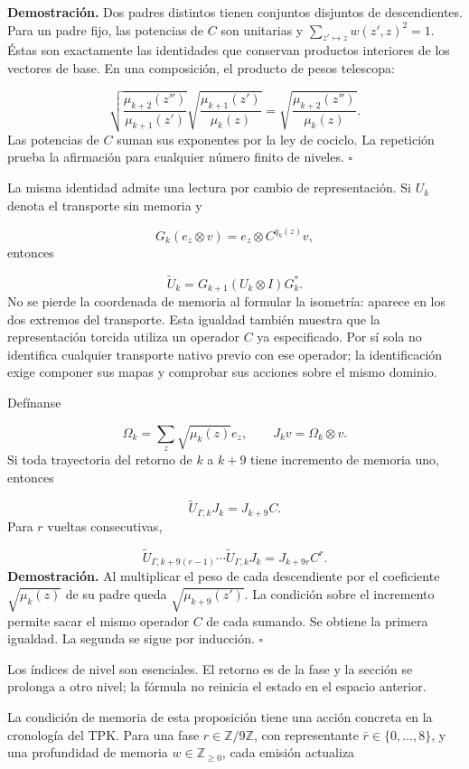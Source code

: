 \textbf{Demostración.} Dos padres distintos tienen conjuntos disjuntos de descendientes. Para un padre fijo, las potencias de \(C\) son unitarias y \(\sum_{z'\mapsto z}w(z',z)^2=1\). Éstas son exactamente las identidades que conservan productos interiores de los vectores de base. En una composición, el producto de pesos telescopa:

\[
\sqrt{\frac{\mu_{k+2}(z'')}{\mu_{k+1}(z')}}
\sqrt{\frac{\mu_{k+1}(z')}{\mu_k(z)}}
=\sqrt{\frac{\mu_{k+2}(z'')}{\mu_k(z)}}.
\]
Las potencias de \(C\) suman sus exponentes por la ley de cociclo. La repetición prueba la afirmación para cualquier número finito de niveles. \hfill\(\square\)

La misma identidad admite una lectura por cambio de representación. Si \(U_k\) denota el transporte sin memoria y

\[
G_k(e_z\otimes v)=e_z\otimes C^{q_k(z)}v,
\]
entonces

\[
\widetilde U_k=G_{k+1}(U_k\otimes I)G_k^*.
\]
No se pierde la coordenada de memoria al formular la isometría: aparece en los dos extremos del transporte. Esta igualdad también muestra que la representación torcida utiliza un operador \(C\) ya especificado. Por sí sola no identifica cualquier transporte nativo previo con ese operador; la identificación exige componer sus mapas y comprobar sus acciones sobre el mismo dominio.

Defínanse

\[
\Omega_k=\sum_z\sqrt{\mu_k(z)}e_z,\qquad
J_kv=\Omega_k\otimes v.
\]
Si toda trayectoria del retorno de \(k\) a \(k+9\) tiene incremento de memoria uno, entonces

\[
\widetilde U_{\Gamma,k}J_k=J_{k+9}C.
\]
Para \(r\) vueltas consecutivas,

\[
\widetilde U_{\Gamma,k+9(r-1)}\cdots
\widetilde U_{\Gamma,k}J_k=J_{k+9r}C^r.
\]
\textbf{Demostración.} Al multiplicar el peso de cada descendiente por el coeficiente \(\sqrt{\mu_k(z)}\) de su padre queda \(\sqrt{\mu_{k+9}(z')}\). La condición sobre el incremento permite sacar el mismo operador \(C\) de cada sumando. Se obtiene la primera igualdad. La segunda se sigue por inducción. \hfill\(\square\)

Los índices de nivel son esenciales. El retorno es de la fase y la sección se prolonga a otro nivel; la fórmula no reinicia el estado en el espacio anterior.

La condición de memoria de esta proposición tiene una acción concreta en la cronología del TPK. Para una fase \(r\in\mathbb Z/9\mathbb Z\), con representante \(\bar r\in\{0,\ldots,8\}\), y una profundidad de memoria \(w\in\mathbb Z_{\geq0}\), cada emisión actualiza

